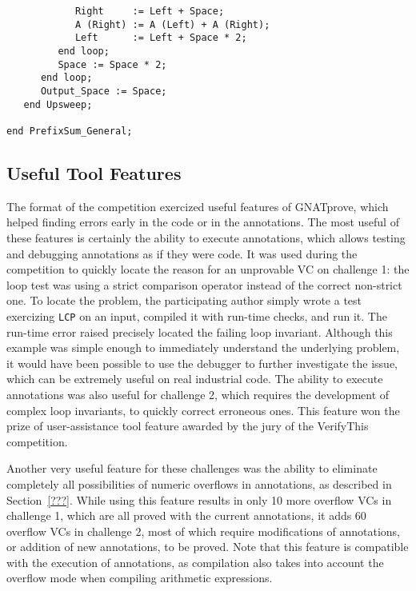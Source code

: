 \documentclass[sttt,draft]{svjour}
\newcommand{\gnatprove}{GNATprove\xspace}
\begin{document}
\begin{footnotesize}
\begin{verbatim}
            Right     := Left + Space;
            A (Right) := A (Left) + A (Right);
            Left      := Left + Space * 2;
         end loop;
         Space := Space * 2;
      end loop;
      Output_Space := Space;
   end Upsweep;

end PrefixSum_General;

\end{verbatim}
\end{footnotesize}

\subsection{Useful Tool Features}

The format of the competition exercized useful features of \gnatprove, which
helped finding errors early in the code or in the annotations. The most useful
of these features is certainly the ability to execute annotations, which allows
testing and debugging annotations as if they were code. It was used during the
competition to quickly locate the reason for an unprovable VC on challenge 1:
the loop test was using a strict comparison operator instead of the correct
non-strict one. To locate the problem, the participating author simply wrote a
test exercizing \verb|LCP| on an input, compiled it with run-time checks, and
run it. The run-time error raised precisely located the failing loop
invariant. Although this example was simple enough to immediately understand
the underlying problem, it would have been possible to use the debugger to
further investigate the issue, which can be extremely useful on real industrial
code. The ability to execute annotations was also useful for challenge 2, which
requires the development of complex loop invariants, to quickly correct
erroneous ones. This feature won the prize of user-assistance tool feature
awarded by the jury of the VerifyThis competition.

Another very useful feature for these challenges was the ability to eliminate
completely all possibilities of numeric overflows in annotations, as described
in Section~\ref{???}. While using this feature results in only 10 more overflow
VCs in challenge 1, which are all proved with the current annotations, it adds
60 overflow VCs in challenge 2, most of which require modifications of
annotations, or addition of new annotations, to be proved. Note that this
feature is compatible with the execution of annotations, as compilation also
takes into account the overflow mode when compiling arithmetic expressions.
\end{document}

